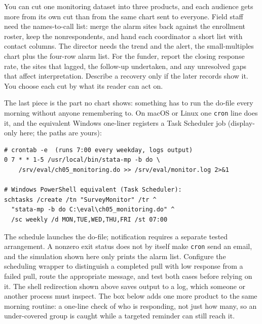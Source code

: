 \documentclass[
    a4paper,
    fontsize=10pt,
    twoside=true,
    numbers=noenddot,
]{kaobook}
\begin{document}
You can cut one monitoring dataset into three products, and each audience gets more from its own cut than from the same chart sent to everyone. Field staff need the names-to-call list: merge the alarm sites back against the enrollment roster, keep the nonrespondents, and hand each coordinator a short list with contact columns. The director needs the trend and the alert, the small-multiples chart plus the four-row alarm list. For the funder, report the closing response rate, the sites that lagged, the follow-up undertaken, and any unresolved gaps that affect interpretation. Describe a recovery only if the later records show it. You choose each cut by what its reader can act on.

The last piece is the part no chart shows: something has to run the do-file every morning without anyone remembering to. On macOS or Linux one \texttt{cron} line does it, and the equivalent Windows one-liner registers a Task Scheduler job (display-only here; the paths are yours):
\par
{\footnotesize
\begin{verbatim}
# crontab -e  (runs 7:00 every weekday, logs output)
0 7 * * 1-5 /usr/local/bin/stata-mp -b do \
    /srv/eval/ch05_monitoring.do >> /srv/eval/monitor.log 2>&1

# Windows PowerShell equivalent (Task Scheduler):
schtasks /create /tn "SurveyMonitor" /tr ^
  "stata-mp -b do C:\eval\ch05_monitoring.do" ^
  /sc weekly /d MON,TUE,WED,THU,FRI /st 07:00
\end{verbatim}
}
The schedule launches the do-file; notification requires a separate tested arrangement. A nonzero exit status does not by itself make \texttt{cron} send an email, and the simulation shown here only prints the alarm list. Configure the scheduling wrapper to distinguish a completed pull with low response from a failed pull, route the appropriate message, and test both cases before relying on it. The shell redirection shown above saves output to a log, which someone or another process must inspect. The box below adds one more product to the same morning routine: a one-line check of who is responding, not just how many, so an under-covered group is caught while a targeted reminder can still reach it.
\end{document}
